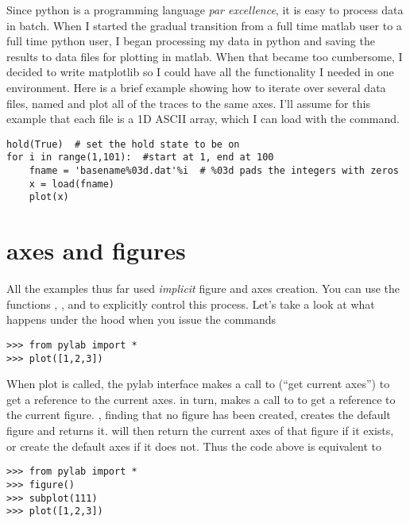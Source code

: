 \documentclass[twoside]{book}
\begin{document}
Since python is a programming language \textit{par excellence}, it is
easy to process data in batch.  When I started the gradual transition
from a full time matlab user to a full time python user, I began
processing my data in python and saving the results to data files for
plotting in matlab.  When that became too cumbersome, I decided to
write matplotlib so I could have all the functionality I needed in one
environment.  Here is a brief example showing how to iterate over
several data files, named  and plot all of the traces to
the same axes.  I'll assume for this example that each file is a 1D
ASCII array, which I can load with the  command.

\begin{lstlisting}
hold(True)  # set the hold state to be on
for i in range(1,101):  #start at 1, end at 100
    fname = 'basename%03d.dat'%i  # %03d pads the integers with zeros
    x = load(fname)
    plot(x)
\end{lstlisting}


\section{axes and figures}
\label{sec:axes_and_figures}
All the examples thus far used \textit{implicit} figure and axes
creation.  You can use the functions , ,
and  to explicitly control this process.  Let's take a look
at what happens under the hood when you issue the commands

\begin{lstlisting}
>>> from pylab import *
>>> plot([1,2,3])
\end{lstlisting}

When plot is called, the pylab interface makes a call to 
(``get current axes'') to get a reference to the current axes.
 in turn, makes a call to  to get a reference to
the current figure.  , finding that no figure has been
created, creates the default figure  and returns it.
 will then return the current axes of that figure if it
exists, or create the default axes  if it does
not.  Thus the code above is equivalent to 

\begin{lstlisting}
>>> from pylab import *
>>> figure()
>>> subplot(111)
>>> plot([1,2,3])
\end{lstlisting}
\end{document}
